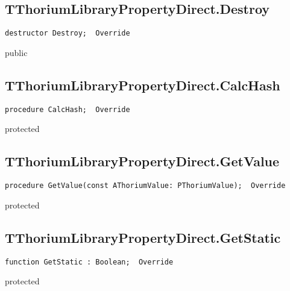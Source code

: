 \subsection{TThoriumLibraryPropertyDirect.Destroy}
\label{thoriumcore:thorium:tthoriumlibrarypropertydirect:destroy}
\begin{FPCList}
\Synopsis
\Declaration 

\begin{verbatim}
destructor Destroy;  Override
\end{verbatim}
\Visibility
public
\Description
\Errors
\end{FPCList}
\subsection{TThoriumLibraryPropertyDirect.CalcHash}
\label{thoriumcore:thorium:tthoriumlibrarypropertydirect:calchash}
\begin{FPCList}
\Synopsis
\Declaration 

\begin{verbatim}
procedure CalcHash;  Override
\end{verbatim}
\Visibility
protected
\Description
\Errors
\end{FPCList}
\subsection{TThoriumLibraryPropertyDirect.GetValue}
\label{thoriumcore:thorium:tthoriumlibrarypropertydirect:getvalue}
\begin{FPCList}
\Synopsis
\Declaration 

\begin{verbatim}
procedure GetValue(const AThoriumValue: PThoriumValue);  Override
\end{verbatim}
\Visibility
protected
\Description
\Errors
\end{FPCList}
\subsection{TThoriumLibraryPropertyDirect.GetStatic}
\label{thoriumcore:thorium:tthoriumlibrarypropertydirect:getstatic}
\begin{FPCList}
\Synopsis
\Declaration 

\begin{verbatim}
function GetStatic : Boolean;  Override
\end{verbatim}
\Visibility
protected
\Description
\Errors
\end{FPCList}
